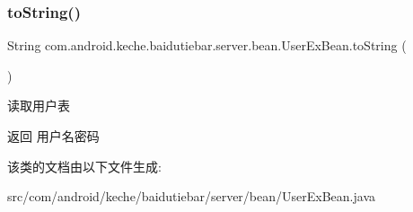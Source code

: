 \subsubsection{\texorpdfstring{to\+String()}{toString()}}
{\footnotesize\ttfamily String com.\+android.\+keche.\+baidutiebar.\+server.\+bean.\+User\+Ex\+Bean.\+to\+String (\begin{DoxyParamCaption}{ }\end{DoxyParamCaption})\hspace{0.3cm}{\ttfamily [inline]}}

读取用户表 \begin{DoxyReturn}{返回}
用户名密码 
\end{DoxyReturn}


该类的文档由以下文件生成\+:\begin{DoxyCompactItemize}
\item 
src/com/android/keche/baidutiebar/server/bean/User\+Ex\+Bean.\+java\end{DoxyCompactItemize}
